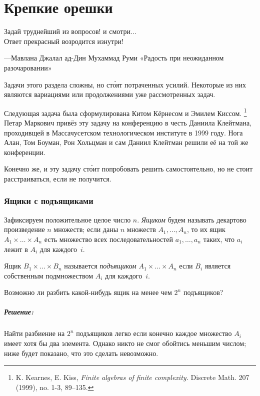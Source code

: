\chapter*{Крепкие орешки}

\setlength{\epigraphwidth}{.6\textwidth}
\epigraph{Задай  труднейший  из  вопросов!  и  смотри...\\
Ответ  прекрасный  возродится  изнутри!}{---Мавлана Джалал ад-Дин Мухаммад Руми «Радость   при   неожиданном разочаровании»
}

Задачи этого раздела сложны, но ст\'{о}ят потраченных усилий.
Некоторые из них являются вариациями или продолжениями уже рассмотренных задач.

\medskip

Следующая задача была сформулирована
Китом Кёрнесом %
и Эмилем Киссом.%
\footnote{K. Kearnes, E. Kiss, \emph{Finite algebras of finite complexity.} Discrete Math. 207 (1999), no. 1-3, 89--135.}
Петар Маркович привёз эту задачу на конференцию в честь Даниила Клейтмана, проходивщей в Массачусетском технологическом институте в 1999 году.
Нога Алан, Том Боуман, Рон Хольцман и сам Даниил Клейтман решили её на той же конференции.

Конечно же, и эту задачу ст\'{о}ит попробовать решить самостоятельно, но не стоит расстраиваться, если не получится.

\subsection*{Ящики с подъящиками}

Зафиксируем положительное целое число $n$.
\emph{Ящиком} будем называть декартово произведение $n$ множеств;
если даны $n$ множеств $A_1,\dots,A_n$, то их ящик $A_1{\times}\dots{\times}A_n$ есть множество всех последовательностей $a_1,\dots,a_n$ таких,
что $a_i$ лежит в $A_i$ для каждого~$i$.

Ящик $B_1{\times}\dots{\times}B_n$ называется \emph{подъящиком} $A_1{\times}\dots{\times}A_n$ если $B_i$ является собственным подмножеством $A_i$ для каждого~$i$. %

Возможно ли разбить какой-нибудь ящик на менее чем $2^n$ подъящиков?

\paragraph{Решение:} Найти разбиение на $2^n$ подъящиков легко если конечно каждое множество $A_i$ имеет хотя бы два элемента.
Однако никто не смог обойтись меньшим числом; ниже будет показано, что это сделать невозможно.

